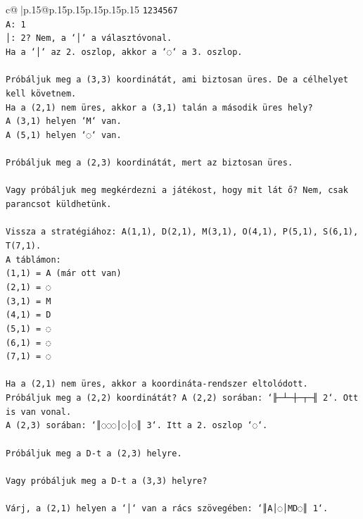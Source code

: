 \documentclass{article}
\begin{document}
{\begin{supertabular}{c@{$\;$}|p{.15\linewidth}@{}p{.15\linewidth}p{.15\linewidth}p{.15\linewidth}p{.15\linewidth}p{.15\linewidth}}
{{{\texttt{1234567} \\
\texttt{A: 1} \\
\texttt{│: 2? Nem, a `│` a választóvonal.} \\
\texttt{Ha a `│` az 2. oszlop, akkor a `◌` a 3. oszlop.} \\
\\ 
\texttt{Próbáljuk meg a (3,3) koordinátát, ami biztosan üres. De a célhelyet kell követnem.} \\
\texttt{Ha a (2,1) nem üres, akkor a (3,1) talán a második üres hely?} \\
\texttt{A (3,1) helyen `M` van.} \\
\texttt{A (5,1) helyen `◌` van.} \\
\\ 
\texttt{Próbáljuk meg a (2,3) koordinátát, mert az biztosan üres.} \\
\\ 
\texttt{Vagy próbáljuk meg megkérdezni a játékost, hogy mit lát ő? Nem, csak parancsot küldhetünk.} \\
\\ 
\texttt{Vissza a stratégiához: A(1,1), D(2,1), M(3,1), O(4,1), P(5,1), S(6,1), T(7,1).} \\
\texttt{A táblámon:} \\
\texttt{(1,1) = A (már ott van)} \\
\texttt{(2,1) = ◌} \\
\texttt{(3,1) = M} \\
\texttt{(4,1) = D} \\
\texttt{(5,1) = ◌} \\
\texttt{(6,1) = ◌} \\
\texttt{(7,1) = ◌} \\
\\ 
\texttt{Ha a (2,1) nem üres, akkor a koordináta{-}rendszer eltolódott.} \\
\texttt{Próbáljuk meg a (2,2) koordinátát? A (2,2) sorában: `╟─┴─┼─┬─╢ 2`. Ott is van vonal.} \\
\texttt{A (2,3) sorában: `║◌◌◌│◌│◌║ 3`. Itt a 2. oszlop `◌`.} \\
\\ 
\texttt{Próbáljuk meg a D{-}t a (2,3) helyre.} \\
\\ 
\texttt{Vagy próbáljuk meg a D{-}t a (3,3) helyre?} \\
\\ 
\texttt{Várj, a (2,1) helyen a `│` van a rács szövegében: `║A│◌│MD◌║ 1`.} \\
}}}
\end{supertabular}}
\end{document}
